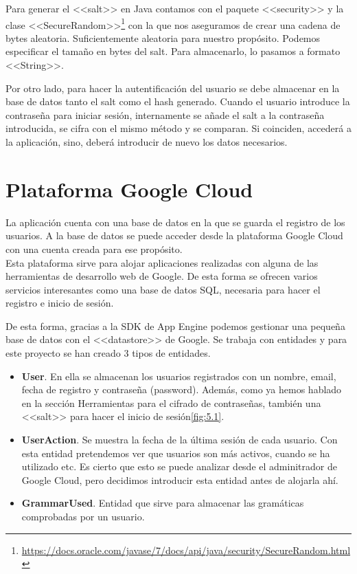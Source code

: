 Para generar el <<salt>> en Java contamos con el paquete <<security>> y la clase <<SecureRandom>>\footnote{\url{https://docs.oracle.com/javase/7/docs/api/java/security/SecureRandom.html}} con la que nos aseguramos de crear una cadena de bytes aleatoria. Suficientemente aleatoria para nuestro propósito. Podemos especificar el tamaño en bytes del salt. Para almacenarlo, lo pasamos a formato <<String>>. 


Por otro lado, para hacer la autentificación del usuario se debe almacenar en la base de datos tanto el salt como el hash generado. Cuando el usuario introduce la contraseña para iniciar sesión, internamente se añade el salt a la contraseña introducida, se cifra con el mismo método y se comparan. Si coinciden, accederá a la aplicación, sino, deberá introducir de nuevo los datos necesarios.



\section{Plataforma Google Cloud}


La aplicación cuenta con una base de datos en la que se guarda el registro de los usuarios. A la base de datos se puede acceder desde la plataforma Google Cloud con una cuenta creada para ese propósito.\\

Esta plataforma sirve para alojar aplicaciones realizadas con alguna de las  herramientas de desarrollo web de Google. De esta forma se ofrecen varios servicios interesantes como una base de datos SQL, necesaria para hacer el registro e inicio de sesión.

De esta forma, gracias a la SDK de App Engine podemos gestionar una pequeña base de datos con el <<datastore>> de Google. Se trabaja con entidades y para este proyecto se han creado 3 tipos de entidades.

\begin{itemize}
\item \textbf{User}. En ella se almacenan los usuarios registrados con un nombre, email, fecha de registro y contraseña (password). Además, como ya hemos hablado en la sección Herramientas para el cifrado de contraseñas, también una <<salt>> para hacer el inicio de sesión\ref{fig:5.1}.
\item \textbf{UserAction}. Se muestra la fecha de la última sesión de cada usuario. Con esta entidad pretendemos ver que usuarios son más activos, cuando se ha utilizado etc. Es cierto que esto se puede analizar desde el adminitrador de Google Cloud, pero decidimos introducir esta entidad antes de alojarla ahí.
\item \textbf{GrammarUsed}. Entidad que sirve para almacenar las gramáticas comprobadas por un usuario. 
\end{itemize}

